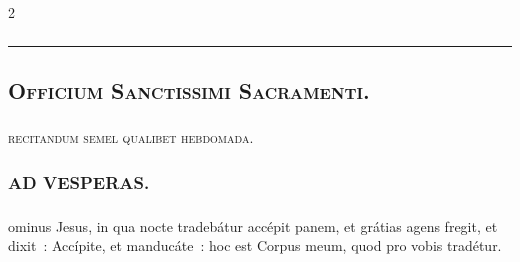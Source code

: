 \documentclass[9pt,twoside]{extarticle}
\begin{document}
\begin{multicols}{2}
{\subsubsection*{\center {}}
\begin{center}\textcolor{red}{\rule{\linewidth}{0.5pt}} \end{center}

\subsection*{\center \textsc{Officium Sanctissimi Sacramenti.}}
\subsubsection*{\center {}}
\begin{center}\textsc{recitandum semel qualibet hebdomada.}\end{center}
\subsubsection*{\center \textsc{AD VESPERAS.}}
\subsubsection*{}
ominus Jesus, in qua nocte tradebátur accépit panem, et grátias agens fregit, et dixit~: Accípite, et manducáte~: hoc est Corpus meum, quod pro vobis tradétur.

}
\end{multicols}
\end{document}
